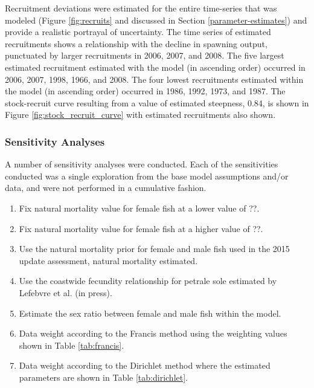 \documentclass[12pt,]{article}
\begin{document}
Recruitment deviations were estimated for the entire time-series that
was modeled (Figure \ref{fig:recruits} and discussed in Section
\ref{parameter-estimates}) and provide a realistic portrayal of
uncertainty. The time series of estimated recruitments shows a
relationship with the decline in spawning output, punctuated by larger
recruitments in 2006, 2007, and 2008. The five largest estimated
recruitment estimated with the model (in ascending order) occurred in
2006, 2007, 1998, 1966, and 2008. The four lowest recruitments estimated
within the model (in ascending order) occurred in 1986, 1992, 1973, and
1987. The stock-recruit curve resulting from a value of estimated
steepness, 0.84, is shown in Figure \ref{fig:stock_recruit_curve} with
estimated recruitments also shown.

\subsubsection{Sensitivity Analyses}\label{sensitivity-analyses}

A number of sensitivity analyses were conducted. Each of the
sensitivities conducted was a single exploration from the base model
assumptions and/or data, and were not performed in a cumulative fashion.

\begin{enumerate}

  \item Fix natural mortality value for female fish at a lower value of ??.
  
  \item Fix natural mortality value for female fish at a higher value of ??.
  
  \item Use the natural mortality prior for female and male fish used in the 2015 update assessment, natural mortality estimated.
  
  \item Use the coastwide fecundity relationship for petrale sole estimated by Lefebvre et al. (in press).
  
  \item Estimate the sex ratio between female and male fish within the model.
  
  \item Data weight according to the Francis method using the weighting values shown in Table \ref{tab:francis}. 
  
  \item Data weight according to the Dirichlet method where the estimated parameters are shown in Table \ref{tab:dirichlet}.
  
\end{enumerate}
\end{document}
